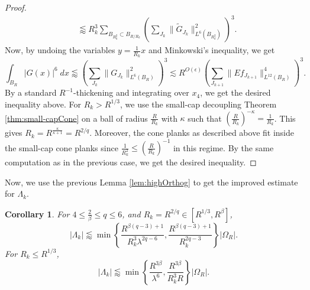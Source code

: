 \documentclass[12pt]{amsart}
\newtheorem{corollary}[theorem]{Corollary}
\begin{document}
\begin{proof}
\begin{align*}
       &\lessapprox R_k^3\sum_{B_{R_k^2}\subset B_{R/R_k}} \left(\sum_{J_k}\|\tilde{G}_{J_k}\|_{L^6(B_{R_k^2})}^2\right)^{3}.
    \end{align*} Now, by undoing the variables $y=\frac{1}{R_k}x$ and Minkowski's inequality, we get $$\int_{B_R}|G(x)|^6\; dx\lessapprox \left(\sum_{J_k}\|G_{J_k}\|_{L^6(B_{R})}^2\right)^{3}\lesssim R^{O(\epsilon)} \left(\sum_{J_{k+1}}\|Ef_{J_{k+1}}\|_{L^{12}(B_R)}^4\right)^{3}.$$ By a standard $R^{-1}$-thickening and integrating over $x_4$, we get the desired inequality above. For $R_k>R^{1/3}$, we use the small-cap decoupling Theorem \ref{thm:small-capCone} on a ball of radius $\frac{R}{R_k}$ with $\kappa$ such that $\left(\frac{R}{R_k}\right)^{-\kappa}= \frac{1}{R_k}$. This gives $R_k= R^\frac{\kappa}{\kappa+1}= R^{2/q}$. Moreover, the cone planks as described above fit inside the small-cap cone planks since $\frac{1}{R_k^2} \le \left(\frac{R}{R_k}\right)^{-1}$ in this regime. By the same computation as in the previous case, we get the desired inequality.
\end{proof}



Now, we use the previous Lemma \ref{lem:highOrthog} to get the improved estimate for $\Lambda_k$.

\begin{corollary}\label{cor:Lambda_kEstimate}
    For $4\le \frac{2}{\beta}\le q\le 6$, and $R_k=R^{2/q}\in [R^{1/3}, R^{\beta}]$, 
    $$|\Lambda_k|\lessapprox\min\left\{\frac{R^{\beta(q-3)+1}}{R_k^3\lambda^{2q-6}}, \frac{R^{\beta(q-3)+1}}{R_k^{2q-3}}\right\}|\Omega_R|.$$ For $R_k\le R^{1/3}$, $$|\Lambda_k|\lessapprox \min\left\{\frac{R^{3\beta}}{\lambda^6}, \frac{R^{3\beta}}{R_k^3R}\right\}|\Omega_R|.$$
\end{corollary}
\end{document}
